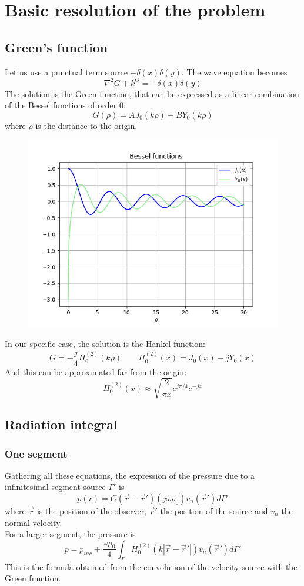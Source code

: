 \documentclass[12pt, openany]{report}
\theoremstyle{definition}
\begin{document}
\chapter{Basic resolution of the problem}
\section{Green's function}
Let us use a punctual term source $-\delta(x) \delta(y)$. The wave equation becomes
\begin{equation}
	\nabla^2 G + k^ G = -\delta(x)\delta(y)
\end{equation}
The solution is the Green function, that can be expressed as a linear combination of the Bessel functions of order 0:
\begin{equation}
	G(\rho) = AJ_0(k\rho) + BY_0(k\rho)
\end{equation}
where $\rho$ is the distance to the origin. 
\begin{figure}[H]
	\centering 
	\includegraphics[width=.5\textwidth]{img/bessel.png}
\end{figure}
In our specific case, the solution is the Hankel function:
\begin{equation}
	G = -\frac{j}{4}H_0^{(2)}(k\rho) \qquad H_0^{(2)}(x) = J_0(x)-jY_0(x)
\end{equation}
And this can be approximated far from the origin:
\begin{equation}
	H_0^{(2)}(x) \approx \sqrt{\frac{2}{\pi x}} e^{j\pi/4} e^{-jx}
\end{equation}
\section{Radiation integral}
\subsection{One segment}
Gathering all these equations, the expression of the pressure due to a infinitesimal segment source $\Gamma'$ is 
\begin{equation}
	p(r) = G(\vec r-\vec r') (j\omega \rho_0) v_n(\vec r')d\Gamma '
\end{equation}
where $\vec r$ is the position of the observer, $\vec r'$ the position of the source and $v_n$ the normal velocity. \\
For a larger segment, the pressure is 
\begin{equation}
	p = p_{inc} + \frac{\omega \rho_0}{4}  \int_\Gamma H_0^{(2)}(k|\vec r-\vec r'|)v_n(\vec r') d\Gamma'
\end{equation}
This is the formula obtained from the convolution of the velocity source with the Green function. 
\end{document}
